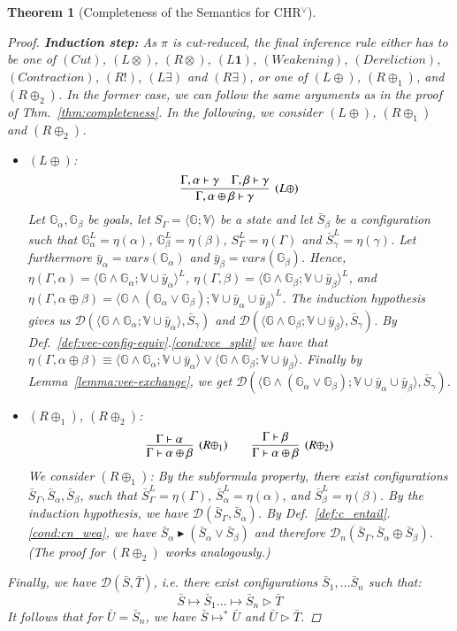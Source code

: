 \documentclass[acmtocl]{acmtrans2m}
\newtheorem{theorem}{Theorem}[section]
\newcommand\state[1]{\langle #1 \rangle}
\newcommand\ent{\rhd}
\newcommand\entv{\blacktriangleright}
\newcommand{\V}{\ensuremath{\mathbb{V}}}
\newcommand{\G}{\ensuremath{\mathbb{G}}}
\newcommand{\cD}{\ensuremath{\mathcal{D}}}
\newcommand{\bS}{\bar{S}}
\newcommand{\bT}{\bar{T}}
\newcommand{\bU}{\bar{U}}
\newcommand{\by}{\bar{y}}
\newcommand{\lone}{\boldsymbol{1}}
\begin{document}
\begin{theorem}[Completeness of the Semantics for CHR$^\vee$]
\begin{proof}
	\textbf{Induction step:}
	As $\pi$ is cut-reduced, the final inference rule either has to be one of
	$(Cut)$, $(L\otimes)$, $(R\otimes)$, $(L\lone)$, $(Weakening)$, $(Dereliction)$,
	$(Contraction)$, $(R!)$, $(L\exists)$ and $(R\exists)$, or one of $(L\oplus)$,
	$(R\oplus_1)$, and $(R\oplus_2)$. In the former case, we can follow the same
	arguments as in the proof of Thm.~\ref{thm:completeness}. In the following,
	we consider $(L\oplus)$, $(R\oplus_1)$ and $(R\oplus_2)$.

	\begin{itemize}
	  \item $(L\oplus)$:
		\[
		\infer[(L\oplus)]{\Gamma,\alpha\oplus\beta\vdash\gamma}
		    {\Gamma,\alpha\vdash\gamma&\Gamma,\beta\vdash\gamma}
		\]
		Let $\G_\alpha,\G_\beta$ be goals, let
$S_\Gamma=\state{\G;\V}$ be a state
		and let $\bS_\beta$ be a configuration such that
$\G_\alpha^L=\eta(\alpha)$,
		$\G_\beta^L=\eta(\beta)$, $S_\Gamma^L=\eta(\Gamma)$ and
		$\bS_\gamma^L=\eta(\gamma)$. Let furthermore $\by_\alpha=vars(\G_\alpha)$ and $\by_\beta=vars(\G_\beta)$. Hence,
		$\eta(\Gamma,\alpha)=\state{\G\wedge\G_\alpha;\V\cup\by_\alpha}^L$,
		$\eta(\Gamma,\beta)=\state{\G\wedge\G_\beta;\V\cup\by_\beta}^L$, and
		$\eta(\Gamma,\alpha\oplus\beta)=\state{\G\wedge(\G_\alpha \vee
\G_\beta);\V\cup\by_\alpha\cup\by_\beta}^L$.
		The induction hypothesis gives us
		$\cD(\state{\G\wedge\G_\alpha;\V\cup\by_\alpha},\bS_\gamma)$ and
		$\cD(\state{\G\wedge\G_\beta;\V\cup\by_\beta},\bS_\gamma)$.
		By Def.~\ref{def:vee-config-equiv}.\ref{cond:vce_split} we have that
		$\eta(\Gamma,\alpha\oplus\beta)\equiv\state{\G\wedge\G_\alpha;\V\cup\by_\alpha}\vee\state{
		\G\wedge\G_\beta;\V\cup\by_\beta}$.
		Finally by Lemma~\ref{lemma:vee-exchange}, we get $\cD(\state{\G\wedge(\G_\alpha \vee
		\G_\beta);\V\cup\by_\alpha\cup\by_\beta},\bS_\gamma)$.

	  \item $(R\oplus_1)$,  $(R\oplus_2)$:
	  	\[
		\infer[(R\oplus_1)]{\Gamma\vdash\alpha\oplus\beta}
		    {\Gamma\vdash\alpha}
		\quad\quad
		\infer[(R\oplus_2)]{\Gamma\vdash\alpha\oplus\beta}
		    {\Gamma\vdash\beta}
		\]
		We consider $(R\oplus_1)$: By the subformula property, there exist
		configurations $\bS_\Gamma, \bS_\alpha, \bS_\beta$, such that
		$\bS_\Gamma^L=\eta(\Gamma)$, $\bS_\alpha^L=\eta(\alpha)$, and
		$\bS_\beta^L=\eta(\beta)$. By the induction hypothesis, we have
		$\cD(\bS_\Gamma,\bS_\alpha)$. By
		Def.~\ref{def:c_entail}.\ref{cond:cn_wea}, we have
		$\bS_\alpha\entv(\bS_\alpha\vee\bS_\beta)$ and therefore
		$\cD_n(\bS_\Gamma,\bS_\alpha\oplus\bS_\beta)$. (The proof for $(R\oplus_2)$
		works analogously.)
	\end{itemize}

	Finally, we have $\cD(\bS,\bT)$, i.e. there exist configurations $\bS_1,\ldots \bS_n$ such that:
	\[
		\bS \mapsto \bS_1 \ldots \mapsto \bS_n \ent \bT
	\]
	It follows that for $\bU=\bS_n$, we have $\bS\mapsto^{*}\bU$ and $\bU\ent\bT$.
\end{proof}
\end{theorem}
\end{document}
